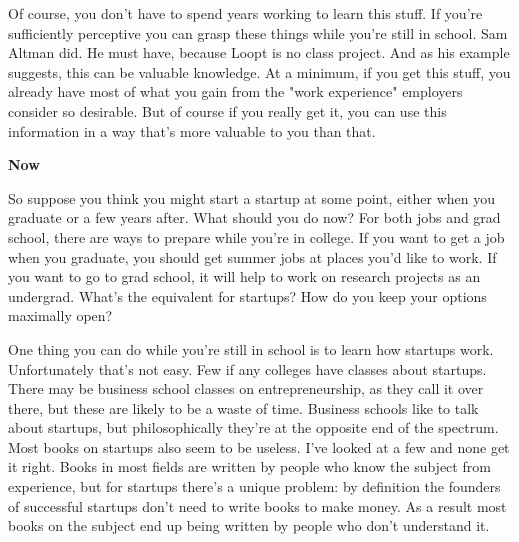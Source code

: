 Of
                  course, you don't have to spend years working to learn this
                  stuff. If you're sufficiently perceptive you can grasp these
                  things while you're still in school. Sam Altman did. He must
                  have, because Loopt is no class project. And as his example
                  suggests, this can be valuable knowledge. At a minimum, if you
                  get this stuff, you already have most of what you gain from
                  the "work experience" employers consider so desirable. But of
                  course if you really get it, you can use this information in a
                  way that's more valuable to you than that.

\textbf{Now}

So suppose you think you might start a startup at
                  some point, either when you graduate or a few years after.
                  What should you do now? For both jobs and grad school, there
                  are ways to prepare while you're in college. If you want to
                  get a job when you graduate, you should get summer jobs at
                  places you'd like to work. If you want to go to grad school,
                  it will help to work on research projects as an undergrad.
                  What's the equivalent for startups? How do you keep your
                  options maximally open?

One thing you can do while
                  you're still in school is to learn how startups work.
                  Unfortunately that's not easy. Few if any colleges have
                  classes about startups. There may be business school classes
                  on entrepreneurship, as they call it over there, but these are
                  likely to be a waste of time. Business schools like to talk
                  about startups, but philosophically they're at the opposite
                  end of the spectrum. Most books on startups also seem to be
                  useless. I've looked at a few and none get it right. Books in
                  most fields are written by people who know the subject from
                  experience, but for startups there's a unique problem: by
                  definition the founders of successful startups don't need to
                  write books to make money. As a result most books on the
                  subject end up being written by people who don't understand
                  it.


